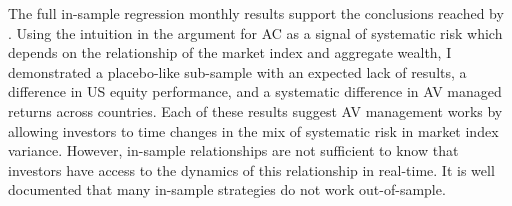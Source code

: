 The full in-sample regression monthly results support the conclusions reached by \citet{pollet_average_2010}. Using the intuition in the argument for AC as a signal of systematic risk which depends on the relationship of the market index and aggregate wealth, I demonstrated a placebo-like sub-sample with an expected lack of results, a difference in US equity performance, and a systematic difference in AV managed returns across countries. Each of these results suggest AV management works by allowing investors to time changes in the mix of systematic risk in market index variance. However, in-sample relationships are not sufficient to know that investors have access to the dynamics of this relationship in real-time. It is well documented that many in-sample strategies do not work out-of-sample.